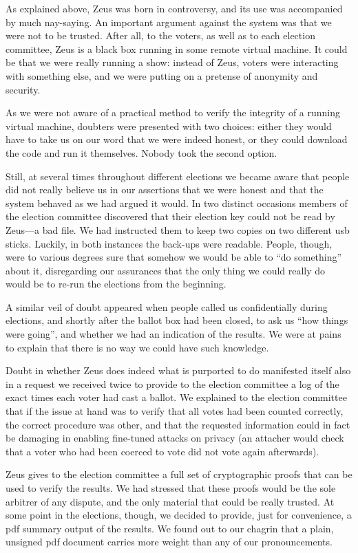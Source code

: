 \documentclass[letterpaper,10pt]{article}
\begin{document}
As explained above, Zeus was born in controversy, and its use was
accompanied by much nay-saying. An important argument against the
system was that we were not to be trusted. After all, to the voters,
as well as to each election committee, Zeus is a black box running in
some remote virtual machine. It could be that we were really running a
show: instead of Zeus, voters were interacting with something else, and
we were putting on a pretense of anonymity and security. 

As we were not aware of a practical method to verify the integrity of
a running virtual machine, doubters were presented with two choices:
either they would have to take us on our word that we were indeed
honest, or they could download the code and run it themselves. Nobody
took the second option. 

Still, at several times throughout different elections we became aware
that people did not really believe us in our assertions that we were
honest and that the system behaved as we had argued it would. In two
distinct occasions members of the election committee discovered that
their election key could not be read by Zeus---a bad file. We had
instructed them to keep two copies on two different {\sc usb} sticks.
Luckily, in both instances the back-ups were readable. People, though,
were to various degrees sure that somehow we would be able to ``do
something'' about it, disregarding our assurances that the only thing
we could really do would be to re-run the elections from the beginning.

A similar veil of doubt appeared when people called us confidentially
during elections, and shortly after the ballot box had been closed, to
ask us ``how things were going'', and whether we had an indication of
the results. We were at pains to explain that there is no way we could
have such knowledge.

Doubt in whether Zeus does indeed what is purported to do manifested
itself also in a request we received twice to provide to the election
committee a log of the exact times each voter had cast a ballot. We
explained to the election committee that if the issue at hand was to
verify that all votes had been counted correctly, the correct
procedure was other, and that the requested information could in fact
be damaging in enabling fine-tuned attacks on privacy (an attacher
would check that a voter who had been coerced to vote did not vote
again afterwards). 

Zeus gives to the election committee a full set of cryptographic
proofs that can be used to verify the results. We had stressed that
these proofs would be the sole arbitrer of any dispute, and the only
material that could be really trusted. At some point in the elections,
though, we decided to provide, just for convenience, a {\sc pdf}
summary output of the results. We found out to our chagrin that a
plain, unsigned {\sc pdf} document carries more weight than any of our
pronouncements.
\end{document}
